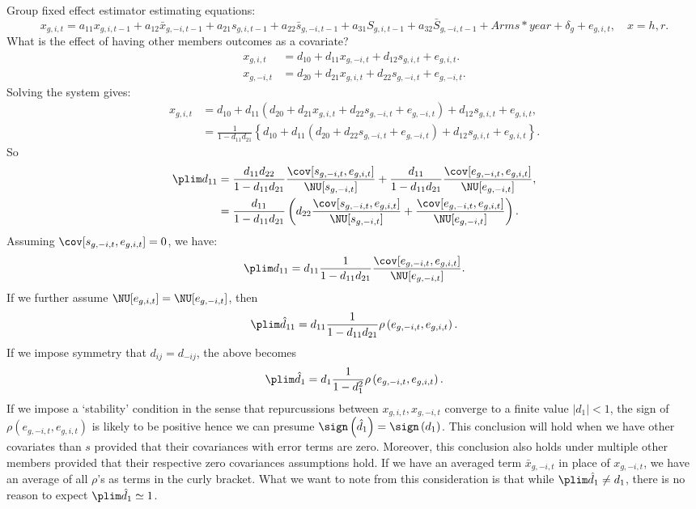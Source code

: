 Group fixed effect estimator estimating equations: 
\[
x_{g,i,t}
=
a_{11}x_{g,i,t-1}+a_{12}\bar{x}_{g,-i,t-1}+a_{21}s_{g,i,t-1}+a_{22}\bar{s}_{g,-i, t-1}+a_{31}S_{g,i,t-1}+a_{32}\bar{S}_{g,-i,t-1}+Arms*year+\delta_{g}+e_{g,i,t},\quad x=h, r.
\]
What is the effect of having other members outcomes as a covariate?
\[
\begin{aligned}
x_{g,i,t}
&=
d_{10}+d_{11}x_{g,-i,t}+d_{12}s_{g,i,t}+e_{g,i,t}.\\
x_{g,-i,t}
&=
d_{20}+d_{21}x_{g,i,t}+d_{22}s_{g,-i,t}+e_{g,-i,t}.
\end{aligned}
\]
Solving the system gives:
\[
\begin{aligned}
x_{g,i,t}
&=
d_{10}+d_{11}\left(d_{20}+d_{21}x_{g,i,t}+d_{22}s_{g,-i,t}+e_{g,-i,t}\right)+d_{12}s_{g,i,t}+e_{g,i,t},\\
&=
\frac{1}{1-d_{11}d_{21}}\left\{d_{10}+d_{11}\left(d_{20}+d_{22}s_{g,-i,t}+e_{g,-i,t}\right)+d_{12}s_{g,i,t}+e_{g,i,t}\right\}.
\end{aligned}
\]
So
\[
\begin{aligned}
\plim d_{11}&=
\frac{d_{11}d_{22}}{1-d_{11}d_{21}}\frac{\cov[s_{g,-i,t}, e_{g,i,t}]}{\NU[s_{g,-i,t}]}+
\frac{d_{11}}{1-d_{11}d_{21}}\frac{\cov[e_{g,-i,t}, e_{g,i,t}]}{\NU[e_{g,-i,t}]},\\
&=
\frac{d_{11}}{1-d_{11}d_{21}}\left(
d_{22}\frac{\cov[s_{g,-i,t}, e_{g,i,t}]}{\NU[s_{g,-i,t}]}+
\frac{\cov[e_{g,-i,t}, e_{g,i,t}]}{\NU[e_{g,-i,t}]}\right).
\end{aligned}
\]
Assuming $\cov[s_{g,-i,t}, e_{g,i,t}]=0$, we have:
\[
\plim d_{11}
=
d_{11}\frac{1}{1-d_{11}d_{21}}
\frac{\cov[e_{g,-i,t}, e_{g,i,t}]}{\NU[e_{g,-i,t}]}.
\]
If we further assume $\NU[e_{g,i,t}]=\NU[e_{g,-i,t}]$, then
\[
\plim \hat{d}_{11}
=
d_{11}\frac{1}{1-d_{11}d_{21}}\rho\left(e_{g,-i,t}, e_{g,i,t}\right).
\]
If we impose symmetry that $d_{ij}=d_{-ij}$, the above becomes
\[
\plim \hat{d}_{1}
=
d_{1}\frac{1}{1-d^{2}_{1}}\rho\left(e_{g,-i,t}, e_{g,i,t}\right).
\]
If we impose a `stability' condition in the sense that repurcussions between $x_{g,i,t}, x_{g,-i,t}$ converge to a finite value $|d_{1}|<1$, the sign of $\rho\left(e_{g,-i,t}, e_{g,i,t}\right)$ is likely to be positive hence we can presume $\sign \left(\hat{d}_{1}\right) = \sign \left(d_{1}\right)$. This conclusion will hold when we have other covariates than $s$ provided that their covariances with error terms are zero. Moreover, this conclusion also holds under multiple other members provided that their respective zero covariances assumptions hold. If we have an averaged term $\bar{x}_{g,-i,t}$ in place of $x_{g,-i,t}$, we have an average of all $\rho$'s as terms in the curly bracket. What we want to note from this consideration is that while $\plim \hat{d}_{1}\neq d_{1}$, there is no reason to expect $\plim \hat{d}_{1}\simeq 1$.


